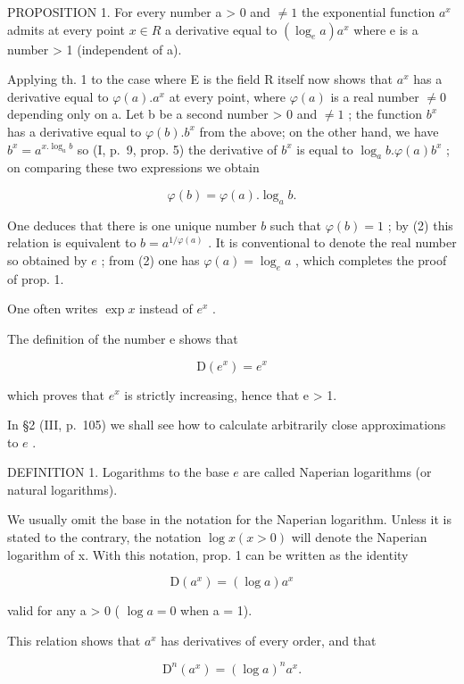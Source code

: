PROPOSITION 1. For every number a \textgreater{} 0 and \(\neq 1\) the exponential function \(a^{x}\) admits at every point \(x \in R\) a derivative equal to \((\log_{e}a)a^{x}\) where e is a number \textgreater{} 1 (independent of a).

Applying th. 1 to the case where E is the field R itself now shows that \(a^{x}\) has a derivative equal to \(\varphi(a).a^{x}\) at every point, where \(\varphi(a)\) is a real number \(\neq 0\) depending only on a. Let b be a second number \textgreater{} 0 and \(\neq 1\) ; the function \(b^{x}\) has a derivative equal to \(\varphi(b).b^{x}\) from the above; on the other hand, we have \(b^{x} = a^{x.\log_{a}b}\) so (I, p.~9, prop. 5) the derivative of \(b^{x}\) is equal to \(\log_{a}b.\varphi(a)b^{x}\) ; on comparing these two expressions we obtain

\[
\varphi (b) = \varphi (a). \log_ {a} b.\tag{2}
\]

One deduces that there is one unique number \(b\) such that \(\varphi(b) = 1\) ; by (2) this relation is equivalent to \(b = a^{1/\varphi(a)}\) . It is conventional to denote the real number so obtained by \(e\) ; from (2) one has \(\varphi(a) = \log_e a\) , which completes the proof of prop. 1.

One often writes \(\exp x\) instead of \(e^x\) .

The definition of the number e shows that

\[
\mathrm{D} (e ^ {x}) = e ^ {x}\tag{3}
\]

which proves that \(e^{x}\) is strictly increasing, hence that e \textgreater{} 1.

In §2 (III, p.~105) we shall see how to calculate arbitrarily close approximations to \(e\) .

DEFINITION 1. Logarithms to the base \(e\) are called Naperian logarithms (or natural logarithms).

We usually omit the base in the notation for the Naperian logarithm. Unless it is stated to the contrary, the notation \(\log x (x > 0)\) will denote the Naperian logarithm of x. With this notation, prop. 1 can be written as the identity

\[
\mathrm{D} \left(a ^ {x}\right) = (\log a) a ^ {x}\tag{4}
\]

valid for any a \textgreater{} 0 ( \(\log a = 0\) when a = 1).

This relation shows that \(a^x\) has derivatives of every order, and that

\[
\mathrm{D} ^ {n} \left(a ^ {x}\right) = (\log a) ^ {n} a ^ {x}.\tag{5}
\]

